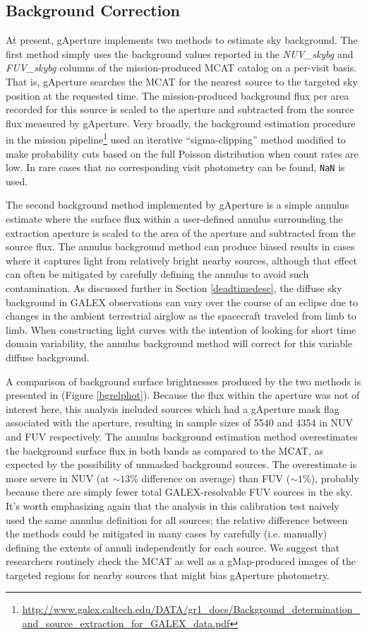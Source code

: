 \documentclass[preprint]{aastex}
\begin{document}
\subsection{Background Correction}
\label{bgcorr}
At present, gAperture implements two methods to estimate sky background. The first method simply uses the background values reported in the \emph{NUV\_skybg} and \emph{FUV\_skybg} columns of the mission-produced MCAT catalog on a per-visit basis. That is, gAperture searches the MCAT for the nearest source to the targeted sky position at the requested time. The mission-produced background flux per area recorded for this source is scaled to the aperture and subtracted from the source flux measured by gAperture. Very broadly, the background estimation procedure in the mission pipeline\footnote{\url{http://www.galex.caltech.edu/DATA/gr1_docs/Background_determination_and_source_extraction_for_GALEX_data.pdf}} used an iterative ``sigma-clipping'' method modified to make probability cuts based on the full Poisson distribution when count rates are low. In rare cases that no corresponding visit photometry can be found, \texttt{NaN} is used.

The second background method implemented by gAperture is a simple annulus estimate where the surface flux within a user-defined annulus surrounding the extraction aperture is scaled to the area of the aperture and subtracted from the source flux. The annulus background method can produce biased results in cases where it captures light from relatively bright nearby sources, although that effect can often be mitigated by carefully defining the annulus to avoid such contamination. As discussed further in Section \ref{deadtimedesc}, the diffuse sky background in GALEX observations can vary over the course of an eclipse due to changes in the ambient terrestrial airglow as the spacecraft traveled from limb to limb. When constructing light curves with the intention of looking for short time domain variability, the annulus background method will correct for this variable diffuse background.

A comparison of background surface brightnesses produced by the two methods is presented in (Figure \ref{bgrelphot}). Because the flux within the aperture was not of interest here, this analysis included sources which had a gAperture mask flag associated with the aperture, resulting in sample sizes of 5540 and 4354 in NUV and FUV respectively. The annulus background estimation method overestimates the background surface flux in both bands as compared to the MCAT, as expected by the possibility of unmasked background sources. The overestimate is more severe in NUV (at $\sim 13\%$ difference on average) than FUV ($\sim 1\%$), probably because there are simply fewer total GALEX-resolvable FUV sources in the sky. It's worth emphasizing again that the analysis in this calibration test naively used the same annulus definition for all sources; the relative difference between the methods could be mitigated in many cases by carefully (i.e. manually) defining the extents of annuli independently for each source. We suggest that researchers routinely check the MCAT as well as a gMap-produced images of the targeted regions for nearby sources that might bias gAperture photometry.
\end{document}
